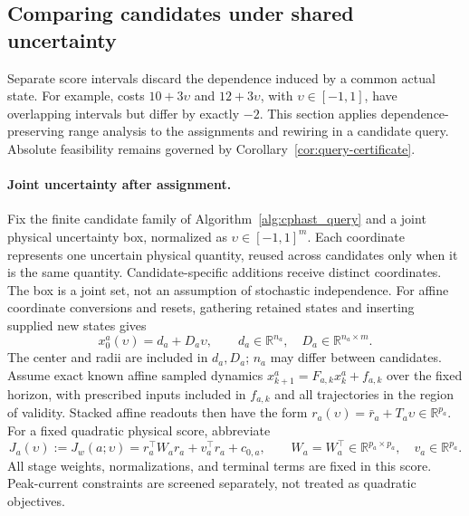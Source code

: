 \subsection{Comparing candidates under shared uncertainty}
\label{app:paired-candidate-bounds}

Separate score intervals discard the dependence induced by a common actual
state. For example, costs $10+3\upsilon$ and $12+3\upsilon$, with
$\upsilon\in[-1,1]$, have overlapping intervals but differ by exactly $-2$.
This section applies dependence-preserving range analysis
\citep{stolfi2003affine} to the assignments and rewiring in a candidate query.
Absolute feasibility remains governed by Corollary~\ref{cor:query-certificate}.

\paragraph{Joint uncertainty after assignment.}
Fix the finite candidate family of Algorithm~\ref{alg:cphast_query} and a
joint physical uncertainty box, normalized as $\upsilon\in[-1,1]^m$.
Each coordinate represents one uncertain physical quantity, reused across
candidates only when it is the same quantity. Candidate-specific additions
receive distinct coordinates. The box is a joint set, not an assumption of
stochastic independence. For affine coordinate conversions and resets,
gathering retained states and inserting supplied new states gives
\[
 x_0^a(\upsilon)=d_a+D_a\upsilon,
 \qquad d_a\in\mathbb R^{n_a},\quad D_a\in\mathbb R^{n_a\times m}.
\]
The center and radii are included in $d_a,D_a$; $n_a$ may differ between
candidates. Assume exact known affine sampled dynamics
$x_{k+1}^a=F_{a,k}x_k^a+f_{a,k}$ over the fixed horizon, with prescribed inputs
included in $f_{a,k}$ and all trajectories in the region of validity.
Stacked affine readouts then have the form
$r_a(\upsilon)=\bar r_a+T_a\upsilon\in\mathbb R^{p_a}$.
For a fixed quadratic physical score, abbreviate
\begin{equation}
 J_a(\upsilon):=J_w(a;\upsilon)
 =r_a^\top W_a r_a+v_a^\top r_a+c_{0,a},
 \qquad W_a=W_a^\top\in\mathbb R^{p_a\times p_a},\quad
 v_a\in\mathbb R^{p_a}.
 \label{eq:paired-score-setup}
\end{equation}
All stage weights, normalizations, and terminal terms are fixed in this
score. Peak-current constraints are screened separately, not treated as
quadratic objectives.

